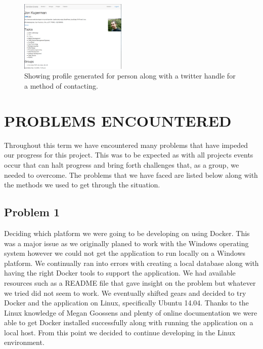 \documentclass[letterpaper,10pt,onecolumn]{IEEEtran} %
\begin{document}
\begin{enumerate}[label*=\arabic*.]
\end{enumerate}

\begin{figure}[htp]
  \begin{center}
  
  \includegraphics[width=2in]{peopleProfile}
  \centering
  \caption{Showing profile generated for person along with a twitter handle for a method of contacting. }

  \end{center}
\end{figure}

\section{PROBLEMS ENCOUNTERED}

Throughout this term we have encountered many problems that have impeded our
progress for this project. This was to be expected as with all projects events
occur that can halt progress and bring forth challenges that, as a group, we
needed to overcome. The problems that we have faced are listed below along with
the methods we used to get through the situation.

\subsection{Problem 1}
Deciding which platform we were going to be developing on using Docker. This was
a major issue as we originally planed to work with the Windows operating system
however we could not get the application to run locally on a Windows platform.
We continually ran into errors with creating a local database along with having
the right Docker tools to support the application. We had available resources
such as a README file that gave insight on the problem but whatever we tried did
not seem to work. We eventually shifted gears and decided to try Docker and the
application on Linux, specifically Ubuntu 14.04. Thanks to the Linux knowledge
of Megan Goossens and plenty of online documentation we were able to get Docker
installed successfully along with running the application on a local host. From
this point we decided to continue developing in the Linux environment.
\end{document}
